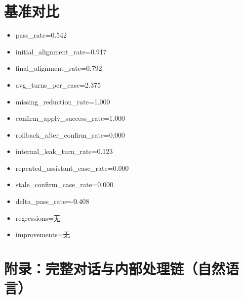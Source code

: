 \documentclass[11pt]{ctexart}
\begin{document}
\section{基准对比}
\begin{itemize}
\item pass\_rate=0.542
\item initial\_alignment\_rate=0.917
\item final\_alignment\_rate=0.792
\item avg\_turns\_per\_case=2.375
\item missing\_reduction\_rate=1.000
\item confirm\_apply\_success\_rate=1.000
\item rollback\_after\_confirm\_rate=0.000
\item internal\_leak\_turn\_rate=0.123
\item repeated\_assistant\_case\_rate=0.000
\item stale\_confirm\_case\_rate=0.000
\item delta\_pass\_rate=-0.408
\item regressions=无
\item improvements=无
\end{itemize}
\appendix
\section{附录：完整对话与内部处理链（自然语言）}
\end{document}
